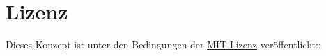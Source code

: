 

%  

\section{Lizenz} %

Dieses Konzept ist unter den Bedingungen der
\href{https://opensource.org/licenses/mit-license.php}{MIT Lizenz}
veröffentlicht::

\begin{figure}[H]
    \scriptsize
\end{figure}
